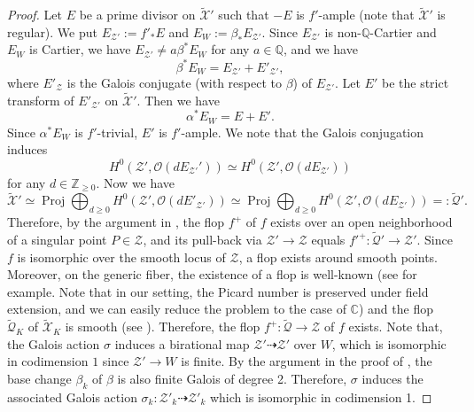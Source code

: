 \documentclass[autodetect-engine, a4paper]{amsart}
\theoremstyle{definition}
\def\Q{{\mathbb Q}}
\def\C{{\mathbb C}}
\def\Z{{\mathbb Z}}
\def\cO{\mathcal{O}}
\DeclareMathOperator\Proj{\mathrm{Proj}}
\begin{document}
\begin{proof}
Let $E$ be a prime divisor on $\widetilde{\mathcal{X}}'$ such that $-E$ is $f'$-ample (note that $\widetilde{\mathcal{X}}'$ is regular).
We put $E_{\mathcal{Z}'} := f'_{\ast} E$ and $E_{W} := \beta_{\ast} E_{\mathcal{Z}'}$.
Since $E_{\mathcal{Z}'}$ is non-$\Q$-Cartier and $E_{W}$ is Cartier, we have $E_{\mathcal{Z}'} \neq a \beta^{*} E_{W}$ for any $a\in \Q$, and we have
\[
\beta^{\ast} E_{W} = E_{\mathcal{Z}'} + E'_{\mathcal{Z}'},
\]
where $E'_{\mathcal{Z}}$ is the Galois conjugate (with respect to $\beta$) of $E_{\mathcal{Z}'}$.
Let $E'$ be the strict transform of $E'_{\mathcal{Z}'}$ on $\widetilde{\mathcal{X}}'.$
Then we have
\[
\alpha^{*} E_{W} = E+ E'.
\]
Since $\alpha^{\ast} E_{W}$ is $f'$-trivial, $E'$ is $f'$-ample.
We note that the Galois conjugation induces
\[
H^0(\mathcal{Z}', \cO (d E_{\mathcal{Z}'}')) \simeq  H^0(\mathcal{Z}', \cO(d E_{\mathcal{Z}'}))
\]
for any $d \in \Z_{\geq 0}$.
Now we have
\begin{equation}
\label{eqn:Galoisconj}
\widetilde{\mathcal{X}}' \simeq  \Proj \bigoplus_{d \geq 0} H^{0}(\mathcal{Z}', \cO(dE'_{\mathcal{Z}'})) \simeq \Proj \bigoplus_{d \geq 0} H^{0}(\mathcal{Z}', \cO(dE_{\mathcal{Z}'})) =: \widetilde{\mathcal{Q}}'.
\end{equation}
Therefore, by the argument in \cite[Proposition 6.6]{Kollar-Mori}, the flop $f^{+}$ of $f$ exists over an open neighborhood of a singular point $P \in \mathcal{Z}$, and its pull-back via $\mathcal{Z}' \rightarrow \mathcal{Z}$ equals 
$f'^{+} \colon \widetilde{\mathcal{Q}}' \rightarrow \mathcal{Z}'$.
Since $f$ is isomorphic over the smooth locus of $\mathcal{Z}$, a flop exists around smooth points.
Moreover, on the generic fiber, the existence of a flop is well-known (see \cite[Theorem 6.14]{Kollar-Mori} for example. Note that in our setting, the Picard number is preserved under field extension, and we can easily reduce the problem to the case of $\C$) and the flop $\widetilde{\mathcal{Q}}_{K}$ of $\widetilde{\mathcal{X}}_{K}$ is smooth (see \cite[Theorem 2.4]{Kollarflop}).
Therefore, the flop $f^{+} \colon \widetilde{\mathcal{Q}} \rightarrow \mathcal{Z}$
of $f$ exists.
Note that, the Galois action $\sigma$ induces a birational map $\mathcal{Z}' \dashrightarrow \mathcal{Z}'$ over $W$, which is isomorphic in codimension $1$ since $\mathcal{Z}' \rightarrow W$ is finite.
By the argument in the proof of \cite[Theorem 6.13]{Tanakaflop}, the base change $\beta_{k}$ of $\beta$ is also finite Galois of degree 2.
Therefore, $\sigma$ induces the associated Galois action $\sigma_{k} \colon \mathcal{Z}'_{k} \dashrightarrow \mathcal{Z}'_{k}$ which is isomorphic in codimension 1.

\end{proof}
\end{document}
